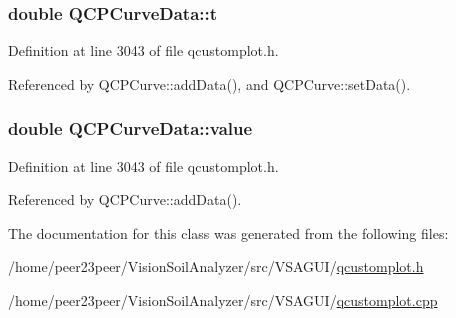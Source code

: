 \subsubsection[{t}]{\setlength{\rightskip}{0pt plus 5cm}double Q\+C\+P\+Curve\+Data\+::t}\label{class_q_c_p_curve_data_aecc395525be28e9178a088793beb3ff3}


Definition at line 3043 of file qcustomplot.\+h.



Referenced by Q\+C\+P\+Curve\+::add\+Data(), and Q\+C\+P\+Curve\+::set\+Data().

\hypertarget{class_q_c_p_curve_data_a72b39b8e1dbf7b45382ebd48419b6828}{}
\subsubsection[{value}]{\setlength{\rightskip}{0pt plus 5cm}double Q\+C\+P\+Curve\+Data\+::value}\label{class_q_c_p_curve_data_a72b39b8e1dbf7b45382ebd48419b6828}


Definition at line 3043 of file qcustomplot.\+h.



Referenced by Q\+C\+P\+Curve\+::add\+Data().



The documentation for this class was generated from the following files\+:\begin{DoxyCompactItemize}
\item 
/home/peer23peer/\+Vision\+Soil\+Analyzer/src/\+V\+S\+A\+G\+U\+I/\hyperlink{qcustomplot_8h}{qcustomplot.\+h}\item 
/home/peer23peer/\+Vision\+Soil\+Analyzer/src/\+V\+S\+A\+G\+U\+I/\hyperlink{qcustomplot_8cpp}{qcustomplot.\+cpp}\end{DoxyCompactItemize}
